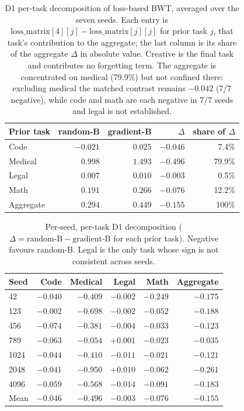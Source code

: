 \begin{table}[!htbp]
\caption{D1 per-task decomposition of loss-based BWT, averaged over the seven seeds. Each entry is $\text{loss\_matrix}[4][j] - \text{loss\_matrix}[j][j]$ for prior task $j$, that task's contribution to the aggregate; the last column is its share of the aggregate $\Delta$ in absolute value. Creative is the final task and contributes no forgetting term. The aggregate is concentrated on medical (79.9\%) but not confined there: excluding medical the matched contrast remains $-0.042$ (7/7 negative), while code and math are each negative in 7/7 seeds and legal is not established.}
\label{tab:d1_per_task}
\centering
\small
\begin{tabular}{@{}lrrrr@{}}
\toprule
\textbf{Prior task} & \textbf{random-B} & \textbf{gradient-B} & \textbf{$\Delta$} & \textbf{share of $\Delta$} \\
\midrule
Code    & $-0.021$ & $0.025$ & $-0.046$ & 7.4\% \\
Medical & $0.998$ & $1.493$ & $-0.496$ & 79.9\% \\
Legal   & $0.007$ & $0.010$ & $-0.003$ & 0.5\% \\
Math    & $0.191$ & $0.266$ & $-0.076$ & 12.2\% \\
\midrule
Aggregate & $0.294$ & $0.449$ & $-0.155$ & 100\% \\
\bottomrule
\end{tabular}
\end{table}

\begin{table}[h]
\caption{Per-seed, per-task D1 decomposition ($\Delta = \text{random-B} - \text{gradient-B}$ for each prior task). Negative favours random-B. Legal is the only task whose sign is not consistent across seeds.}
\label{tab:d1_per_task_seeds}
\centering
\small
\begin{tabular}{@{}lrrrrr@{}}
\toprule
\textbf{Seed} & \textbf{Code} & \textbf{Medical} & \textbf{Legal} & \textbf{Math} & \textbf{Aggregate} \\
\midrule
42   & $-0.040$ & $-0.409$ & $-0.002$ & $-0.249$ & $-0.175$ \\
123  & $-0.002$ & $-0.698$ & $-0.002$ & $-0.052$ & $-0.188$ \\
456  & $-0.074$ & $-0.381$ & $-0.004$ & $-0.033$ & $-0.123$ \\
789  & $-0.063$ & $-0.054$ & $+0.001$ & $-0.023$ & $-0.035$ \\
1024 & $-0.044$ & $-0.410$ & $-0.011$ & $-0.021$ & $-0.121$ \\
2048 & $-0.041$ & $-0.950$ & $+0.010$ & $-0.062$ & $-0.261$ \\
4096 & $-0.059$ & $-0.568$ & $-0.014$ & $-0.091$ & $-0.183$ \\
\midrule
Mean & $-0.046$ & $-0.496$ & $-0.003$ & $-0.076$ & $-0.155$ \\
\bottomrule
\end{tabular}
\end{table}

